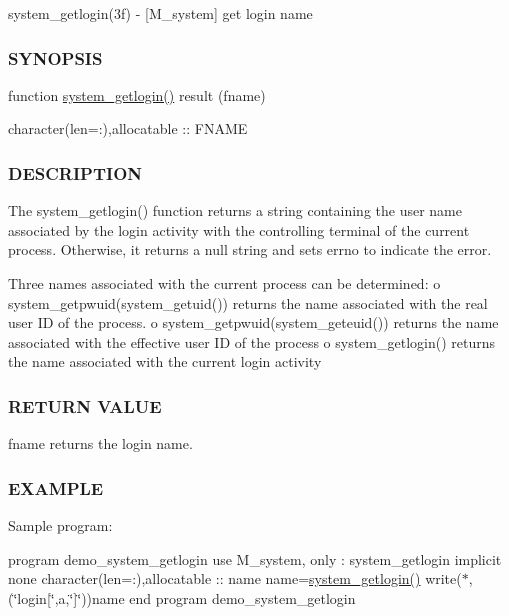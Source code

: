 system\+\_\+getlogin(3f) -\/ \mbox{[}M\+\_\+system\mbox{]} get login name 

\subsubsection*{S\+Y\+N\+O\+P\+S\+IS}

function \hyperlink{namespacem__system_a70f78645a1f130734005e190d469529d}{system\+\_\+getlogin()} result (fname)

character(len=\+:),allocatable \+:\+: F\+N\+A\+ME

\subsubsection*{D\+E\+S\+C\+R\+I\+P\+T\+I\+ON}

\begin{DoxyVerb}The system_getlogin() function returns a string containing the user
name associated by the login activity with the controlling terminal
of the current process.  Otherwise, it returns a null string and sets
errno to indicate the error.

Three names associated with the current process can be determined:
   o system_getpwuid(system_getuid()) returns the name associated with the real user ID of the process.
   o system_getpwuid(system_geteuid()) returns the  name  associated with  the  effective user ID of the process
   o system_getlogin() returns the name associated with the current login activity
\end{DoxyVerb}


\subsubsection*{R\+E\+T\+U\+RN V\+A\+L\+UE}

fname returns the login name.

\subsubsection*{E\+X\+A\+M\+P\+LE}

Sample program\+:

program demo\+\_\+system\+\_\+getlogin use M\+\_\+system, only \+: system\+\_\+getlogin implicit none character(len=\+:),allocatable \+:\+: name name=\hyperlink{namespacem__system_a70f78645a1f130734005e190d469529d}{system\+\_\+getlogin()} write($\ast$,\textquotesingle{}(\char`\"{}login\mbox{[}\char`\"{},a,\char`\"{}\mbox{]}\char`\"{})\textquotesingle{})name end program demo\+\_\+system\+\_\+getlogin

